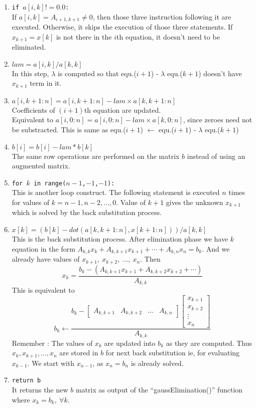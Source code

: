 \begin{commentary}
\begin{enumerate}[label=Line \arabic*]
	\item \texttt{if $a[i,k] != 0.0$:} \\ If $a[i,k] = A_{i+1,k+1} \ne 0$, then those three instruction following it are executed.
		Otherwise, it skips the execution of those three statements.
		If $x_{k+1}=x[k]$ is not there in the $i$th equation, it doesn't need to be eliminated.
	\item \texttt{$lam = a[i,k]/a[k,k]$} \\ In this step, $\lambda$ is computed so that equ.($i+1$) - $\lambda$ equ.($k+1$) doesn't have $x_{k+1}$ term in it.
	\item \texttt{$a[i,k+1:n] = a[i,k+1:n]-lam \times a[k,k+1:n]$} \\ Coefficients of $(i+1)$th equation are updated.\\
		Equivalent to $a[i,0:n] = a[i,0:n] - lam \times a[k,0:n]$, since zeroes need not be substracted.
		This is same as equ.($i+1$) $\leftarrow$ equ.($i+1$) - $\lambda$ equ.($k+1$)
	\item \texttt{$b[i] = b[i]-lam*b[k]$} \\ The same row operations are performed on the matrix $b$ instead of using an augmented matrix.
	\item \texttt{for $k$ in range($n-1$,$-1$,$-1$):} \\ This is another loop construct.
		The following statement is executed $n$ times for values of $k = n-1, n-2, \dots, 0$.
		Value of $k+1$ gives the unknown $x_{k+1}$ which is solved by the back substitution process.
	\item \texttt{$x[k] = (b[k]-dot(a[k,k+1:n],x[k+1:n]))/a[k,k]$} \\ This is the back substitution process.
		After elimination phase we have $k$ equation in the form $A_{k,k}x_{k} + A_{k,k+1}x_{k+1}+\dotsb+A_{k,n}x_n = b_k$.
		And we already have values of $x_{k+1},\ x_{k+2},\ \dots,\ x_n$.
		Then
	\[x_{k} = \frac{b_k - (A_{k,k+1}x_{k+1} + A_{k,k+2}x_{k+2}+\dotsb)}{A_{k,k}}\]
	This is equivalent to 
		\[ b_k \leftarrow \frac{ b_k - \begin{bmatrix}A_{k,k+1} & A_{k,k+2} & \dots & A_{k,n} \end{bmatrix}\begin{bmatrix} x_{k+1} \\ x_{k+2} \\ \vdots \\ x_n \end{bmatrix}}{A_{k,k}} \]
	Remember : The values of $x_k$ are updated into $b_k$ as they are computed.
		Thus $x_{k}, x_{k+1}, \dots, x_n$ are stored in $b$ for next back substitution ie, for evaluating $x_{k-1}$.
		We start with $x_{n-1}$, as $x_n = b_n$ is already solved.
	\item \texttt{return b} \\ It returns the new $b$ matrix as output of the ``gaussElimination()'' function where $x_k = b_k,\ \forall k$.
\end{enumerate}
\end{commentary}

